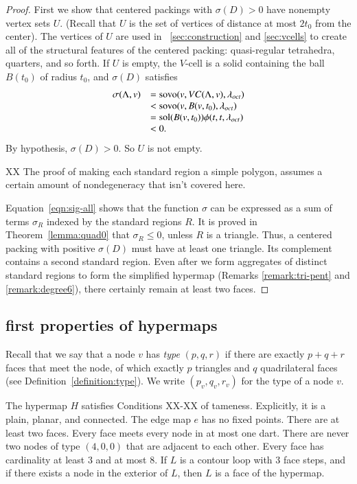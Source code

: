 \begin{proof}
First we show that centered packings with $\sigma(D)>0$ have
nonempty vertex sets $U$. (Recall that $U$ is the set of vertices
of distance at most $2t_0$ from the center).  The vertices of $U$
are used in \Chaps~\ref{sec:construction} and \ref{sec:vcells} to
create all of the structural features of the centered packing:
quasi-regular tetrahedra, quarters, and so forth. If $U$ is empty,
the $V$-cell is a solid containing the ball $B(t_0)$ of radius
$t_0$, and $\sigma(D)$ satisfies
    $$
    \begin{array}{lll}
    \sigma(\Lambda,v) &= {\operatorname{sovo}}(v,VC(\Lambda,v),\lambda_{oct})\\
              &< {\operatorname{sovo}}(v,B(v,t_0),\lambda_{oct})\\
              &= \operatorname{sol}(B(v,t_0))\phi(t,t,\lambda_{oct})\\
              &< 0.
    \end{array}
    $$
By hypothesis, $\sigma(D)>0$.  So $U$ is not empty.

XX The proof of making each standard region a simple polygon, assumes a
certain amount of nondegeneracy that isn't covered here.

Equation~\ref{eqn:sig-all} shows that the function $\sigma$ can be
expressed as a sum of terms $\sigma_R$ indexed by the standard
regions $R$. It is proved in Theorem~\ref{lemma:quad0} that
$\sigma_R\le0$, unless $R$ is a triangle. Thus, a centered packing
with positive $\sigma(D)$ must have at least one triangle. Its
complement contains a second standard region. Even after we form
aggregates of distinct standard regions to form the simplified
hypermap (Remarks \ref{remark:tri-pent} and \ref{remark:degree6}),
there certainly remain at least two faces.
\end{proof}


\subsection{first properties of hypermaps}
    \label{sec:startame}


Recall that we say that a node $v$ has {\it type\/} $(p,q,r)$ if
there are exactly $p+q+r$ faces that meet the node, of which exactly
$p$ triangles and $q$ quadrilateral faces (see
Definition~\ref{definition:type}).  We write $(p_v,q_v,r_v)$ for the
type of a node $v$.

\begin{lemma} The hypermap $H$ satisfies Conditions XX-XX of tameness.
Explicitly, it is a plain, planar, and connected. The edge map $e$
has no fixed points. There are at least two faces. Every face meets
every node in at most one dart.  There are never two nodes of type
$(4,0,0)$ that are adjacent to each other.  Every face has
cardinality at least $3$ and at most $8$.  If $L$ is a contour loop
with $3$ face steps, and if there exists a node in the exterior of
$L$, then $L$ is a face of the hypermap.
\end{lemma}


